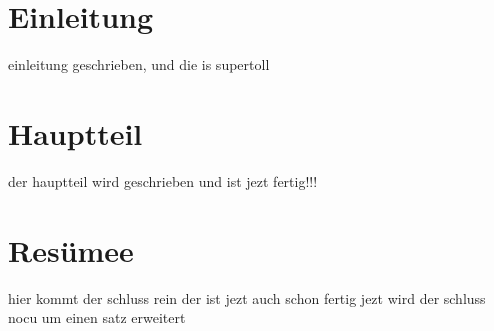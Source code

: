 \documentclass[11pt,a4paper]{article}
\begin{document}
\section{Einleitung}

einleitung geschrieben, und die is supertoll

\section{Hauptteil}

der hauptteil wird geschrieben und ist jezt fertig!!!

\section{Resümee}

hier kommt der schluss rein der ist jezt auch schon fertig
jezt wird der schluss nocu um einen satz erweitert
\end{document}
